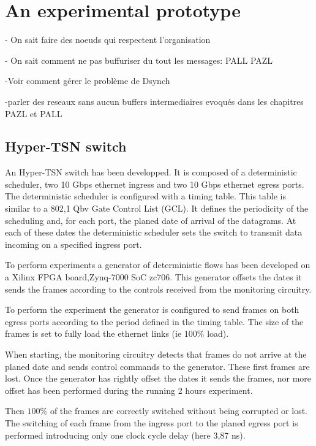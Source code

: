 \section{An experimental prototype}
\label{sec:platform}
- On sait faire des noeuds qui respectent l'organisation

- On sait comment ne pas buffuriser du tout les messages: PALL PAZL

-Voir comment gérer le problème de Dsynch

-parler des reseaux sans aucun buffers intermediaires evoqués dans les chapitres PAZL et PALL
\subsection{Hyper-TSN switch}

An Hyper-TSN switch has been developped. It is composed of a deterministic scheduler, two 10 Gbps ethernet ingress and two 10 Gbps ethernet egress ports. The deterministic scheduler is configured with a timing table. This table is similar to a 802,1 Qbv Gate Control List (GCL). It defines the periodicity of the scheduling and, for each port, the planed date of arrival of the datagrams. At each of these dates the deterministic scheduler sets the switch to transmit data incoming on a specified ingress port.

To perform experiments a generator of deterministic flows has been developed on a Xilinx FPGA board,Zynq-7000 SoC zc706. This generator offsets the dates it sends the frames according to the controls received from the monitoring circuitry.

To perform the experiment the generator is configured to send frames on both egress ports according to the period defined in the timing table. The size of the frames is set to fully load the ethernet links (ie $100\%$ load).

When starting, the monitoring circuitry detects that frames do not arrive at the planed date and sends control commands to the generator. These first frames are lost. Once the generator has rightly offset the dates it sends the frames, nor more offset has been performed during the running 2 hours experiment.

Then $100\%$ of the frames are correctly switched without being corrupted or lost. The switching of each frame from the ingress port to the planed egress port is performed introducing only one clock cycle delay (here 3,87 ns).
